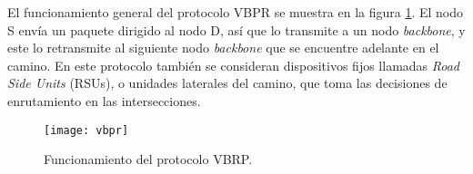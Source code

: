 El funcionamiento general del protocolo VBPR se muestra en la figura
\ref{fig:vbpr}. El nodo S envía un paquete dirigido al nodo D, así que lo
transmite a un nodo \textit{backbone}, y este lo retransmite al siguiente nodo
\textit{backbone} que se encuentre adelante en el camino. En este protocolo
también se consideran dispositivos fijos llamadas \textit{Road Side Units}
(RSUs), o unidades laterales del camino, que toma las decisiones de
enrutamiento en las intersecciones.

\begin{figure}[th]
\centering
\texttt{[image: vbpr]}
\decoRule
\caption[Funcionamiento del protocolo VBRP]{Funcionamiento del protocolo VBRP\protect\footnotemark.}
\label{fig:vbpr}
\end{figure}

